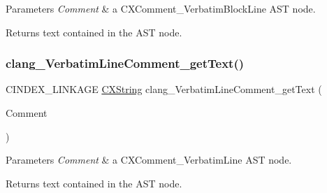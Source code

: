 \begin{DoxyParams}{Parameters}
{\em Comment} & a {\ttfamily C\+X\+Comment\+\_\+\+Verbatim\+Block\+Line} A\+ST node.\\
\hline
\end{DoxyParams}
\begin{DoxyReturn}{Returns}
text contained in the A\+ST node. 
\end{DoxyReturn}
\mbox{\label{group__CINDEX__COMMENT_ga4eb1de9012b525f14051409427bd8eb2}} 
\subsubsection{\texorpdfstring{clang\+\_\+\+Verbatim\+Line\+Comment\+\_\+get\+Text()}{clang\_VerbatimLineComment\_getText()}}
{\footnotesize\ttfamily C\+I\+N\+D\+E\+X\+\_\+\+L\+I\+N\+K\+A\+GE \mbox{\hyperlink{structCXString}{C\+X\+String}} clang\+\_\+\+Verbatim\+Line\+Comment\+\_\+get\+Text (\begin{DoxyParamCaption}\item[{\mbox{\hyperlink{structCXComment}{C\+X\+Comment}}}]{Comment }\end{DoxyParamCaption})}


\begin{DoxyParams}{Parameters}
{\em Comment} & a {\ttfamily C\+X\+Comment\+\_\+\+Verbatim\+Line} A\+ST node.\\
\hline
\end{DoxyParams}
\begin{DoxyReturn}{Returns}
text contained in the A\+ST node. 
\end{DoxyReturn}
